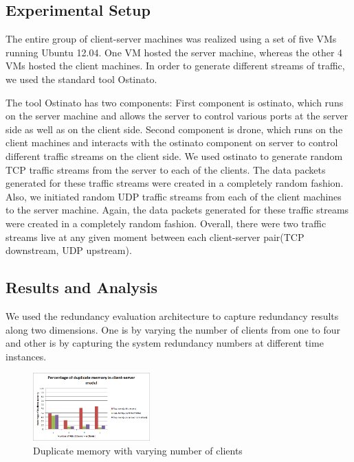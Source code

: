 \documentclass{acm_proc_article-sp}
\begin{document}
\subsection{Experimental Setup}
The entire group of client-server machines was realized using a set of five VMs running Ubuntu 12.04. One VM hosted the server machine, whereas the other 4 VMs hosted the client machines. In order to generate different streams of traffic, we used the standard tool Ostinato.

The tool Ostinato has two components: First component is ostinato, which runs on the server machine and allows the server to control various ports at the server side as well as on the client side. Second component is drone, which runs on the client machines and interacts with the ostinato component on server to control different traffic streams on the client side. We used ostinato to generate random TCP traffic streams from the server to each of the clients. The data packets generated for these traffic streams were created in a completely random fashion. Also, we initiated random UDP traffic streams from each of the client machines to the server machine. Again, the data packets generated for these traffic streams were created in a completely random fashion. Overall, there were two traffic streams live at any given moment between each client-server pair(TCP downstream, UDP upstream).

\subsection{Results and Analysis}
We used the redundancy evaluation architecture to capture redundancy results along two dimensions. One is by varying the number of clients from one to four and other is by capturing the system redundancy numbers at different time instances.

\begin{figure}[htbp]
\centering
        \includegraphics[width=0.4\textwidth]{images/client-server1.png}
    \caption{Duplicate memory with varying number of clients}
    \label{fig:client-server1}
\end{figure}
\end{document}

